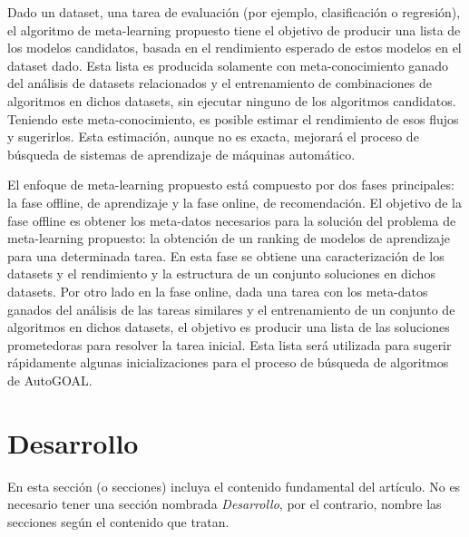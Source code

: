 \documentclass[a4paper,10pt,twocolumn]{article}
\begin{document}
 Dado un dataset, una tarea de evaluación (por ejemplo, clasificación o regresión), el algoritmo de meta-learning propuesto tiene el objetivo de producir una lista de los modelos candidatos, basada en el rendimiento esperado de estos modelos en el dataset dado. Esta lista es producida solamente con meta-conocimiento ganado del análisis de datasets relacionados y el entrenamiento de combinaciones de algoritmos en dichos datasets, sin ejecutar ninguno de los algoritmos candidatos. Teniendo este meta-conocimiento, es posible estimar el rendimiento de esos flujos y sugerirlos. Esta estimación, aunque no es exacta, mejorará el proceso de búsqueda de sistemas de aprendizaje de máquinas automático.

 El enfoque de meta-learning propuesto está compuesto por dos fases principales: la fase offline, de aprendizaje y la fase online, de recomendación. El objetivo de la fase offline es obtener los meta-datos necesarios para la solución del problema de meta-learning propuesto: la obtención de un ranking de modelos de aprendizaje para una determinada tarea. En esta fase se obtiene una caracterización de los datasets y el rendimiento y la estructura de un conjunto soluciones en dichos datasets. Por otro lado en la fase online, dada una tarea con los meta-datos ganados del análisis de las tareas similares y el entrenamiento de un conjunto de algoritmos en dichos datasets, el objetivo es producir una lista de las soluciones prometedoras para resolver la tarea inicial. Esta lista será utilizada para sugerir rápidamente algunas inicializaciones para el proceso de búsqueda de algoritmos de AutoGOAL.




\section{Desarrollo}\label{sec:dev}
  En esta sección (o secciones) incluya el contenido fundamental del artículo.
  No es necesario tener una sección nombrada \emph{Desarrollo}, por el contrario,
  nombre las secciones según el contenido que tratan.

\end{document}
